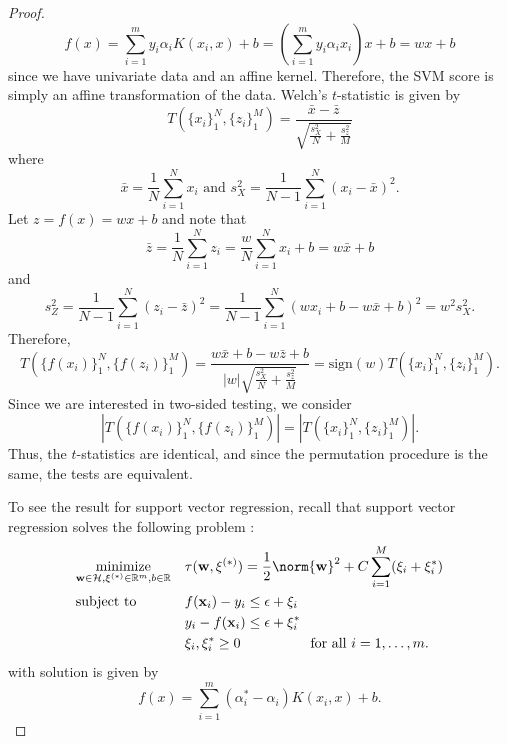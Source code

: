\begin{proof}
  \begin{equation*}
    f(x)=\sum_{i=1}^m y_i \alpha_iK(x_i,x)+b =
    \left ( \sum_{i=1}^m y_i \alpha_i x_i \right )x+b = wx+b
  \end{equation*}
  since we have univariate data and an affine kernel.
  Therefore, the SVM score is simply an affine transformation of the
  data.  Welch's $t$-statistic is given by
  \begin{equation*}
    T(\{x_i\}_1^N,\{z_i\}_1^M) = \frac{\bar{x}-\bar{z}}{\sqrt{\frac{s_X^2}{N}+\frac{s_z^2}{M}}}
  \end{equation*}
  where
  \begin{equation*}
    \bar{x}=\frac{1}{N}\sum_{i=1}^N x_i \text{ and }
    s_X^2= \frac{1}{N-1}\sum_{i=1}^N(x_i-\bar{x})^2.
  \end{equation*}
  Let $z=f(x)=wx+b$ and note that
  \begin{equation*}
    \bar{z}=\frac{1}{N}\sum_{i=1}^N z_i = \frac{w}{N}\sum_{i=1}^N x_i
    + b = w\bar{x}+b
  \end{equation*}
  and
  \begin{equation*}
    s_Z^2= \frac{1}{N-1}\sum_{i=1}^N(z_i-\bar{z})^2= \frac{1}{N-1}\sum_{i=1}^N(wx_i+b-w\bar{x}+b)^2=w^2s_X^2.
  \end{equation*}
  Therefore,
  \begin{equation*}
    T(\{f(x_i)\}_1^N,\{f(z_i)\}_1^M) =
    \frac{w\bar{x}+b-w\bar{z}+b}{|w|\sqrt{\frac{s_X^2}{N}+\frac{s_z^2}{M}}}
    = \text{sign}(w) T(\{x_i\}_1^N,\{z_i\}_1^M).
  \end{equation*}
  Since we are interested in two-sided testing, we consider
  \begin{equation*}
    |T(\{f(x_i)\}_1^N,\{f(z_i)\}_1^M)| = |T(\{x_i\}_1^N,\{z_i\}_1^M)|.
  \end{equation*}
  Thus, the $t$-statistics are identical, and since the permutation
  procedure is the same, the tests are equivalent.

  To see the result for support vector regression,
  recall that support vector regression solves the following problem \cite{scholkopf2002learning}:
  \begin{equation*}
    \begin{aligned}
      & \underset{\mathbf{w}\in\mathcal{H},\mathbf{\xi}^{(*)}\in\mathbb{R}^m,b\in\mathbb{R}}{\text{minimize}}
      & &\tau(\mathbf{w},\mathbf{\xi}^{(*)})=\frac{1}{2}\norm{\mathbf{w}}^2+C\sum_{i=1}^M(\xi_i+\xi_i^*) \\
      & \text{subject to}
      & & f(\mathbf{x}_i)-y_i \leq \epsilon +\xi_i\\
      &&& y_i-f(\mathbf{x}_i) \leq \epsilon+\xi_i^* \\
      &&& \xi_i,\xi_i^*\geq0 \qquad \qquad \quad \text{for all } i=1,\ldots,m.
    \end{aligned}
  \end{equation*}
  with solution is given by
  \begin{equation*}
    f(x)=\sum_{i=1}^m(\alpha_i^*-\alpha_i)K(x_i,x)+b.
  \end{equation*}
\end{proof}

